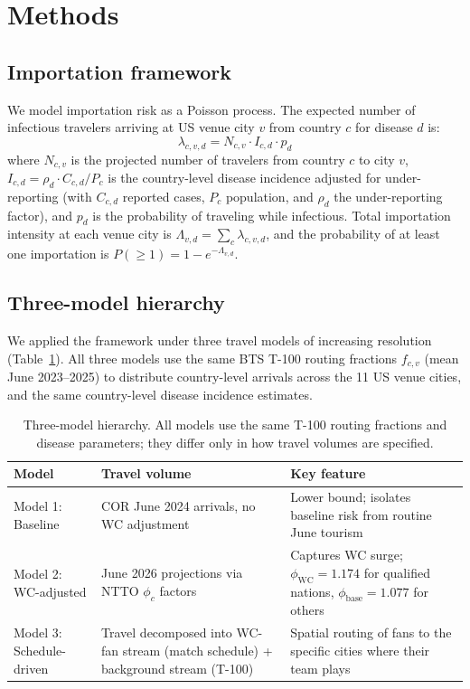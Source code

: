 \documentclass[12pt]{article}
\begin{document}
\section*{Methods}

\subsection*{Importation framework}

We model importation risk as a Poisson process. The expected number
of infectious travelers arriving at US venue city $v$ from country
$c$ for disease $d$ is:
\begin{equation}
  \lambda_{c,v,d} = N_{c,v} \cdot I_{c,d} \cdot p_d
  \label{eq:lambda}
\end{equation}
where $N_{c,v}$ is the projected number of travelers from country $c$
to city $v$, $I_{c,d} = \rho_d \cdot C_{c,d}/P_c$ is the
country-level disease incidence adjusted for under-reporting (with
$C_{c,d}$ reported cases, $P_c$ population, and $\rho_d$ the
under-reporting factor), and $p_d$ is the probability of traveling
while infectious. Total importation intensity at each venue city is
$\Lambda_{v,d} = \sum_c \lambda_{c,v,d}$, and the probability of at
least one importation is $P(\geq 1) = 1 - e^{-\Lambda_{v,d}}$.

\subsection*{Three-model hierarchy}

We applied the framework under three travel models of increasing
resolution (Table~\ref{tab:models}). All three models use the same
BTS T-100 routing fractions $f_{c,v}$ (mean June 2023--2025) to
distribute country-level arrivals across the 11 US venue cities, and
the same country-level disease incidence estimates.

\begin{table}[h!]
\centering
\small
\begin{tabular}{p{2.8cm} p{4.2cm} p{6cm}}
\toprule
\textbf{Model} & \textbf{Travel volume} & \textbf{Key feature} \\
\midrule
Model 1: Baseline &
  COR June 2024 arrivals, no WC adjustment &
  Lower bound; isolates baseline risk from routine June tourism \\[4pt]
Model 2: WC-adjusted &
  June 2026 projections via NTTO $\phi_c$ factors &
  Captures WC surge; $\phi_\text{WC}=1.174$ for qualified nations,
  $\phi_\text{base}=1.077$ for others \\[4pt]
Model 3: Schedule-driven &
  Travel decomposed into WC-fan stream (match schedule) +
  background stream (T-100) &
  Spatial routing of fans to the specific cities where their team plays \\
\bottomrule
\end{tabular}
\caption{Three-model hierarchy. All models use the same T-100 routing
fractions and disease parameters; they differ only in how travel
volumes are specified.}
\label{tab:models}
\end{table}
\end{document}
